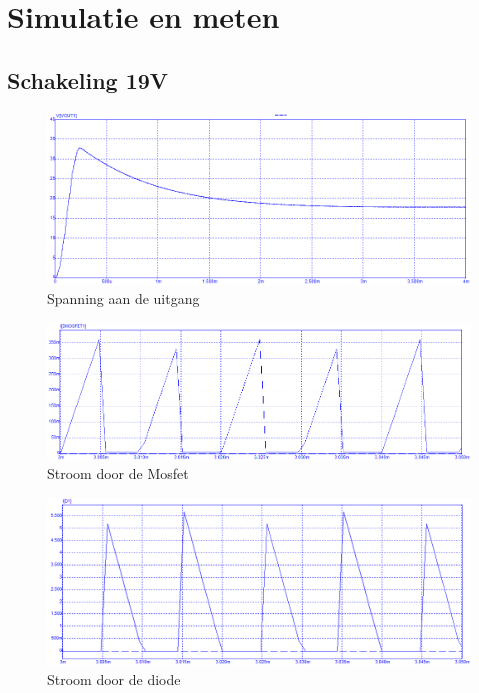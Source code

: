 \documentclass[11pt,a4paper]{article}
\begin{document}
\section{Simulatie en meten}

\subsection{Schakeling 19V}

\begin{figure}[h!]
  \centering
  \includegraphics[width = 13.5cm]{Vout 19V.png}
  \caption{Spanning aan de uitgang}
\end{figure}

\begin{figure}[h!]
  \centering
  \includegraphics[width = 13.5cm]{Ids 19V.png}
  \caption{Stroom door de Mosfet}
\end{figure}

\begin{figure}[h!]
  \centering
  \includegraphics[width = 13.5cm]{Id 19V.png}
  \caption{Stroom door de diode}
\end{figure}
\end{document}
